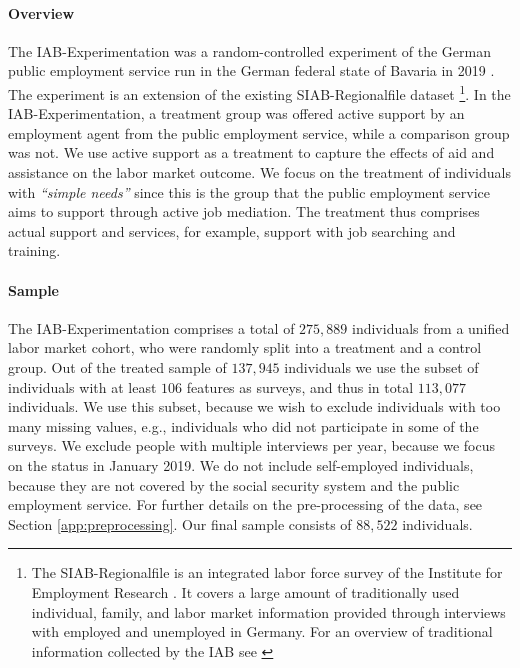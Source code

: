 \paragraph{Overview}
The IAB-Experimentation was a random-controlled experiment of the German public employment service run in the German federal state of Bavaria in 2019 \cite{athey2021policy}. The experiment is an extension of the existing SIAB-Regionalfile dataset \cite{siab2019, siab2019report}\footnote{The SIAB-Regionalfile is an integrated labor force survey of the Institute for Employment Research \cite{siab2019, siab2019report}. It covers a large amount of traditionally used individual, family, and labor market information provided through interviews with employed and unemployed in Germany. For an overview of traditional information collected by the IAB see \citealp{struyven2021spses}}. In the IAB-Experimentation, a treatment group was offered active support by an employment agent from the public employment service, while a comparison group was not. We use active support as a treatment to capture the effects of aid and assistance on the labor market outcome. We focus on the treatment of individuals with \emph{``simple needs''} since this is the group that the public employment service aims to support through active job mediation. The treatment thus comprises actual support and services, for example, support with job searching and training.

\paragraph{Sample}
The IAB-Experimentation comprises a total of $275{,}889$ individuals from a unified labor market cohort, who were randomly split into a treatment and a control group. Out of the treated sample of $137{,}945$ individuals we use the subset of individuals with at least $106$ features as surveys, and thus in total $113{,}077$ individuals. We use this subset, because we wish to exclude individuals with too many missing values, e.g., individuals who did not participate in some of the surveys. We exclude people with multiple interviews per year, because we focus on the status in January 2019. We do not include self-employed individuals, because they are not covered by the social security system and the public employment service. For further details on the pre-processing of the data, see Section \ref{app:preprocessing}. Our final sample consists of $88{,}522$ individuals.


